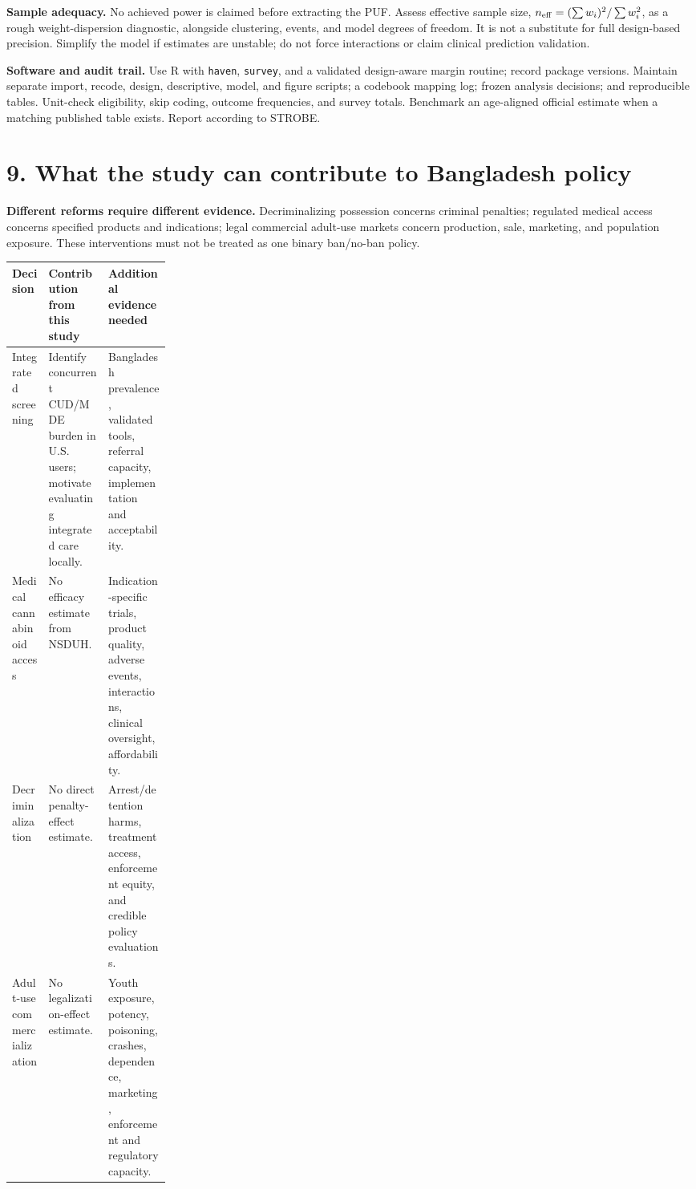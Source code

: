 \documentclass[10pt]{article}
\newcommand{\head}[1]{\section*{\color{navy}#1}}
\begin{document}
\textbf{Sample adequacy.} No achieved power is claimed before extracting the PUF. Assess effective sample size, $n_{\rm eff}=(\sum w_i)^2/\sum w_i^2$, as a rough weight-dispersion diagnostic, alongside clustering, events, and model degrees of freedom. It is not a substitute for full design-based precision. Simplify the model if estimates are unstable; do not force interactions or claim clinical prediction validation.

\textbf{Software and audit trail.} Use R with \texttt{haven}, \texttt{survey}, and a validated design-aware margin routine; record package versions. Maintain separate import, recode, design, descriptive, model, and figure scripts; a codebook mapping log; frozen analysis decisions; and reproducible tables. Unit-check eligibility, skip coding, outcome frequencies, and survey totals. Benchmark an age-aligned official estimate when a matching published table exists. Report according to STROBE.
\newpage
\head{9. What the study can contribute to Bangladesh policy}
\textbf{Different reforms require different evidence.} Decriminalizing possession concerns criminal penalties; regulated medical access concerns specified products and indications; legal commercial adult-use markets concern production, sale, marketing, and population exposure. These interventions must not be treated as one binary ban/no-ban policy.

\begin{tabularx}{\linewidth}{@{}p{0.23\linewidth}XX@{}}\toprule
Decision & Contribution from this study & Additional evidence needed\\\midrule
Integrated screening & Identify concurrent CUD/MDE burden in U.S. users; motivate evaluating integrated care locally. & Bangladesh prevalence, validated tools, referral capacity, implementation and acceptability.\\
Medical cannabinoid access & No efficacy estimate from NSDUH. & Indication-specific trials, product quality, adverse events, interactions, clinical oversight, affordability.\\
Decriminalization & No direct penalty-effect estimate. & Arrest/detention harms, treatment access, enforcement equity, and credible policy evaluations.\\
Adult-use commercialization & No legalization-effect estimate. & Youth exposure, potency, poisoning, crashes, dependence, marketing, enforcement and regulatory capacity.\\\bottomrule
\end{tabularx}
\end{document}
